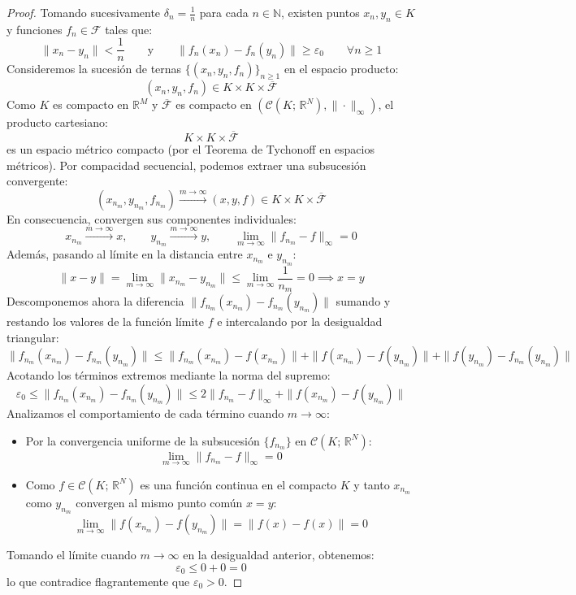 \begin{proof}
    Tomando sucesivamente $\delta_n = \frac{1}{n}$ para cada $n \in \mathbb{N}$, existen puntos $x_n, y_n \in K$ y funciones $f_n \in \mathcal{F}$ tales que:
    \[
        \|x_n - y_n\| < \frac{1}{n} \qquad \text{y} \qquad \|f_n(x_n) - f_n(y_n)\| \geq \varepsilon_0 \qquad \forall n \geq 1
    \]
    Consideremos la sucesión de ternas $\{(x_n, y_n, f_n)\}_{n \geq 1}$ en el espacio producto:
    \[
        (x_n, y_n, f_n) \in K \times K \times \overline{\mathcal{F}}
    \]
    Como $K$ es compacto en $\mathbb{R}^M$ y $\overline{\mathcal{F}}$ es compacto en $(\mathcal{C}(K; \, \mathbb{R}^N), \|\cdot\|_\infty)$, el producto cartesiano:
    \[
        K \times K \times \overline{\mathcal{F}}
    \]
    es un espacio métrico compacto (por el Teorema de Tychonoff en espacios métricos). Por compacidad secuencial, podemos extraer una subsucesión convergente:
    \[
        (x_{n_m}, y_{n_m}, f_{n_m}) \xrightarrow{m \to \infty} (x, y, f) \in K \times K \times \overline{\mathcal{F}}
    \]
    En consecuencia, convergen sus componentes individuales:
    \[
        x_{n_m} \xrightarrow{m \to \infty} x, \qquad y_{n_m} \xrightarrow{m \to \infty} y, \qquad \lim_{m \to \infty} \|f_{n_m} - f\|_\infty = 0
    \]
    Además, pasando al límite en la distancia entre $x_{n_m}$ e $y_{n_m}$:
    \[
        \|x - y\| = \lim_{m \to \infty} \|x_{n_m} - y_{n_m}\| \leq \lim_{m \to \infty} \frac{1}{n_m} = 0 \implies x = y
    \]
    Descomponemos ahora la diferencia $\|f_{n_m}(x_{n_m}) - f_{n_m}(y_{n_m})\|$ sumando y restando los valores de la función límite $f$ e intercalando por la desigualdad triangular:
    \[
        \|f_{n_m}(x_{n_m}) - f_{n_m}(y_{n_m})\| \leq \|f_{n_m}(x_{n_m}) - f(x_{n_m})\| + \|f(x_{n_m}) - f(y_{n_m})\| + \|f(y_{n_m}) - f_{n_m}(y_{n_m})\|
    \]
    Acotando los términos extremos mediante la norma del supremo:
    \[
        \varepsilon_0 \leq \|f_{n_m}(x_{n_m}) - f_{n_m}(y_{n_m})\| \leq 2 \|f_{n_m} - f\|_\infty + \|f(x_{n_m}) - f(y_{n_m})\|
    \]
    Analizamos el comportamiento de cada término cuando $m \to \infty$:
    \begin{itemize}
        \item Por la convergencia uniforme de la subsucesión $\{f_{n_m}\}$ en $\mathcal{C}(K; \, \mathbb{R}^N)$:
        \[
            \lim_{m \to \infty} \|f_{n_m} - f\|_\infty = 0
        \]
        \item Como $f \in \mathcal{C}(K; \, \mathbb{R}^N)$ es una función continua en el compacto $K$ y tanto $x_{n_m}$ como $y_{n_m}$ convergen al mismo punto común $x = y$:
        \[
            \lim_{m \to \infty} \|f(x_{n_m}) - f(y_{n_m})\| = \|f(x) - f(x)\| = 0
        \]
    \end{itemize}
    Tomando el límite cuando $m \to \infty$ en la desigualdad anterior, obtenemos:
    \[
        \varepsilon_0 \leq 0 + 0 = 0
    \]
    lo que contradice flagrantemente que $\varepsilon_0 > 0$.


\end{proof}
